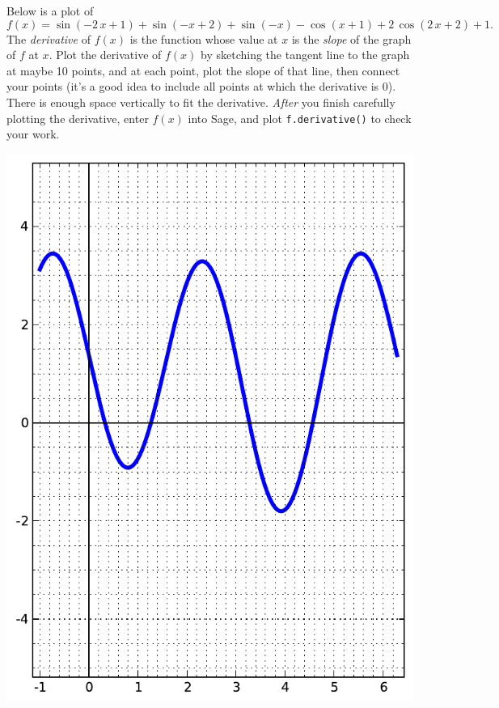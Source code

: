 Below is a plot of $$f(x)=\sin\left(-2 \, x + 1\right) + \sin\left(-x + 2\right) + \sin\left(-x\right) - \cos\left(x + 1\right) + 2 \, \cos\left(2 \, x + 2\right) + 1.$$  The {\em \color{red}derivative} of $f(x)$ is the function whose value at $x$ is the {\em slope} of the graph of $f$ at $x$.  Plot the derivative of $f(x)$ by sketching the tangent line to the graph at maybe 10 points, and at each point, plot the slope of that line, then connect your points (it's a good idea to include all points at which the derivative is 0).  There is enough space vertically to fit the derivative.  {\em After} you finish carefully plotting the derivative, enter $f(x)$ into Sage, and plot {\color{blue}\verb|f.derivative()|} to check your work.
\begin{center}\includegraphics{functions/9.pdf}\end{center}\newpage

